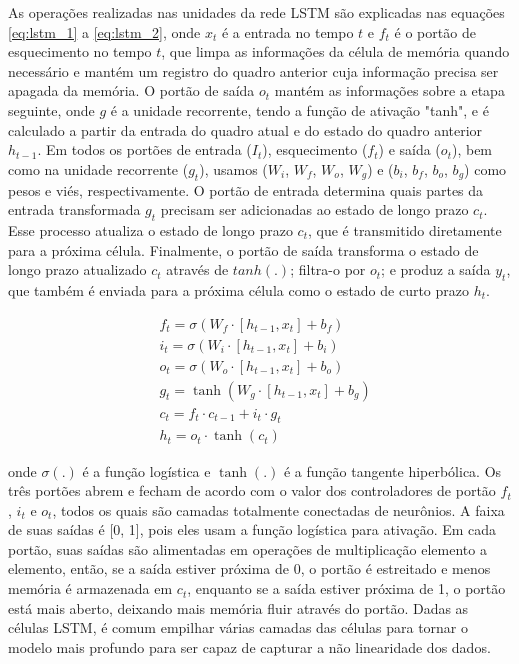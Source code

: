             \ipar As operações realizadas nas unidades da rede \acrshort{LSTM} são explicadas nas equações \eqref{eq:lstm_1} a \eqref{eq:lstm_2}, onde $x_t$ é a entrada no tempo $t$ e $f_t$ é o portão de esquecimento no tempo $t$, que limpa as informações da célula de memória quando necessário e mantém um registro do quadro anterior cuja informação precisa ser apagada da memória. O portão de saída $o_t$ mantém as informações sobre a etapa seguinte, onde $g$ é a unidade recorrente, tendo a função de ativação "tanh", e é calculado a partir da entrada do quadro atual e do estado do quadro anterior $h_{t-1}$. Em todos os portões de entrada ($I_t$), esquecimento ($f_t$) e saída ($o_t$), bem como na unidade recorrente ($g_t$), usamos ($W_i$, $W_f$, $W_o$, $W_g$) e ($b_i$, $b_f$, $b_o$, $b_g$) como pesos e viés, respectivamente. O portão de entrada determina quais partes da entrada transformada $g_t$ precisam ser adicionadas ao estado de longo prazo $c_t$. Esse processo atualiza o estado de longo prazo $c_t$, que é transmitido diretamente para a próxima célula. Finalmente, o portão de saída transforma o estado de longo prazo atualizado $c_t$ através de $tanh(.)$; filtra-o por $o_t$; e produz a saída $y_t$, que também é enviada para a próxima célula como o estado de curto prazo $h_t$.

            \begin{subequations}
                \label{eq:lstm}
                \begin{align}
                    & f_t = \sigma(W_f \cdot [h_{t-1}, x_t] + b_f) \label{eq:lstm_1}\\
                    & i_t = \sigma(W_i \cdot [h_{t-1}, x_t] + b_i) \\
                    & o_t = \sigma(W_o \cdot [h_{t-1}, x_t] + b_o) \\
                    & g_t = \tanh(W_g \cdot [h_{t-1}, x_t] + b_g) \\
                    & c_t = f_t \cdot c_{t-1} + i_t \cdot g_t \\
                    & h_t = o_t \cdot \tanh(c_t) \label{eq:lstm_2}
                \end{align}
            \end{subequations}

            \noindent onde $\sigma(.)$ é a função logística e $\tanh(.)$ é a função tangente hiperbólica. Os três portões abrem e fecham de acordo com o valor dos controladores de portão $f_t$, $i_t$ e $o_t$, todos os quais são camadas totalmente conectadas de neurônios. A faixa de suas saídas é [0, 1], pois eles usam a função logística para ativação. Em cada portão, suas saídas são alimentadas em operações de multiplicação elemento a elemento, então, se a saída estiver próxima de 0, o portão é estreitado e menos memória é armazenada em $c_t$, enquanto se a saída estiver próxima de 1, o portão está mais aberto, deixando mais memória fluir através do portão. Dadas as células \acrshort{LSTM}, é comum empilhar várias camadas das células para tornar o modelo mais profundo para ser capaz de capturar a não linearidade dos dados. 

